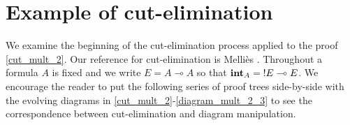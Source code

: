 \documentclass[english,letter paper,12pt,reqno]{article}
\theoremstyle{example}
\numberwithin{equation}{section}
\def\inta{\bold{int}}
\begin{document}
\appendix

\section{Example of cut-elimination}\label{section:appendix_cut_elim}

We examine the beginning of the cut-elimination process applied to the proof \eqref{cut_mult_2}. Our reference for cut-elimination is Melli\`{e}s \cite[\S 3.3]{mellies}. Throughout a formula $A$ is fixed and we write $E = A \multimap A$ so that $\inta_A = {!}E \multimap E$. We encourage the reader to put the following series of proof trees side-by-side with the evolving diagrams in \eqref{cut_mult_2}-\eqref{diagram_mult_2_3} to see the correspondence between cut-elimination and diagram manipulation.
\end{document}
